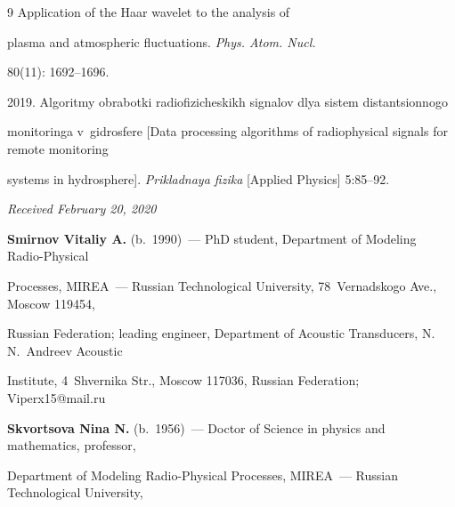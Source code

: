 {{\begin{thebibliography}{9}
Application of the Haar wavelet to the analysis of 

plasma and atmospheric fluctuations. \textit{Phys. Atom. Nucl.} 

80(11): 1692--1696.


 2019. Algoritmy obrabotki radiofizicheskikh signalov dlya sistem distantsionnogo 

monitoringa v~gidrosfere [Data processing algorithms of radiophysical signals for remote monitoring 

systems in hydrosphere]. \textit{Prikladnaya fizika} [Applied Physics] 5:85--92.

\end{thebibliography}

} }






\hfill{\small\textit{Received February 20, 2020}} 








\Contr



\noindent

\textbf{Smirnov Vitaliy A.} (b.\ 1990)~--- PhD student, Department of Modeling Radio-Physical 

Processes, MIREA~--- Russian Technological University, 78~Vernadskogo Ave., Moscow 119454, 

Russian Federation; leading engineer, Department of Acoustic Transducers, N.\,N.~Andreev Acoustic 

Institute, 4~Shvernika Str., Moscow 117036, Russian Federation; \mbox{Viperx15@mail.ru}



\vspace*{3pt}



\noindent

\textbf{Skvortsova Nina N.} (b.\ 1956)~--- Doctor of Science in physics and mathematics, professor, 

Department of Modeling Radio-Physical Processes, MIREA~--- Russian Technological University, 

